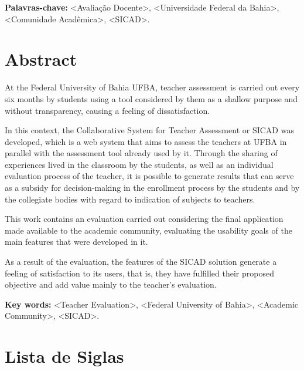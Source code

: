 \documentclass[12pt, a4paper]{report}
\begin{document}
\textbf{Palavras-chave:} <Avaliação Docente>, <Universidade Federal da Bahia>, <Comunidade Acadêmica>, <SICAD>.
\thispagestyle{empty} 

\newpage
\chapter*{Abstract}
At the Federal University of Bahia \ac{UFBA}, teacher assessment is carried out every six months by students using a tool considered by them as a shallow purpose and without transparency, causing a feeling of dissatisfaction.

In this context, the Collaborative System for Teacher Assessment or SICAD was developed, which is a web system that aims to assess the teachers at \ac{UFBA} in parallel with the assessment tool already used by it. Through the sharing of experiences lived in the classroom by the students, as well as an individual evaluation process of the teacher, it is possible to generate results that can serve as a subsidy for decision-making in the enrollment process by the students and by the collegiate bodies with regard to indication of subjects to teachers.

This work contains an evaluation carried out considering the final application made available to the academic community, evaluating the usability goals of the main features that were developed in it.

As a result of the evaluation, the features of the \ac{SICAD} solution generate a feeling of satisfaction to its users, that is, they have fulfilled their proposed objective and add value mainly to the teacher's evaluation. 

\textbf{Key words:} <Teacher Evaluation>, <Federal University of Bahia>, <Academic Community>, <SICAD>.
\thispagestyle{empty} 


\listoffigures
\cleardoublepage


\listoftables
\cleardoublepage

\newpage
\tableofcontents
\thispagestyle{empty}


\chapter*{Lista de Siglas}
\end{document}
